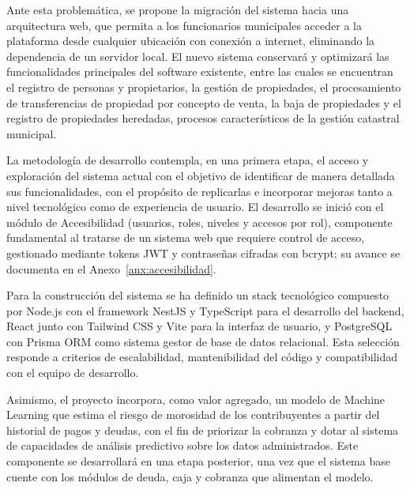 \documentclass[12pt,a4paper]{report}
\begin{document}
Ante esta problemática, se propone la migración del sistema hacia una arquitectura web, que permita a los funcionarios municipales acceder a la plataforma desde cualquier ubicación con conexión a internet, eliminando la dependencia de un servidor local. El nuevo sistema conservará y optimizará las funcionalidades principales del software existente, entre las cuales se encuentran el registro de personas y propietarios, la gestión de propiedades, el procesamiento de transferencias de propiedad por concepto de venta, la baja de propiedades y el registro de propiedades heredadas, procesos característicos de la gestión catastral municipal.

La metodología de desarrollo contempla, en una primera etapa, el acceso y exploración del sistema actual con el objetivo de identificar de manera detallada sus funcionalidades, con el propósito de replicarlas e incorporar mejoras tanto a nivel tecnológico como de experiencia de usuario. El desarrollo se inició con el módulo de Accesibilidad (usuarios, roles, niveles y accesos por rol), componente fundamental al tratarse de un sistema web que requiere control de acceso, gestionado mediante tokens JWT y contraseñas cifradas con bcrypt; su avance se documenta en el Anexo~\ref{anx:accesibilidad}.

Para la construcción del sistema se ha definido un stack tecnológico compuesto por Node.js con el framework NestJS y TypeScript para el desarrollo del backend, React junto con Tailwind CSS y Vite para la interfaz de usuario, y PostgreSQL con Prisma ORM como sistema gestor de base de datos relacional. Esta selección responde a criterios de escalabilidad, mantenibilidad del código y compatibilidad con el equipo de desarrollo.

Asimismo, el proyecto incorpora, como valor agregado, un modelo de Machine Learning que estima el riesgo de morosidad de los contribuyentes a partir del historial de pagos y deudas, con el fin de priorizar la cobranza y dotar al sistema de capacidades de análisis predictivo sobre los datos administrados. Este componente se desarrollará en una etapa posterior, una vez que el sistema base cuente con los módulos de deuda, caja y cobranza que alimentan el modelo.

\clearpage

\renewcommand{\contentsname}{Índices}
\renewcommand{\listfigurename}{Índice de Figuras}
\renewcommand{\listtablename}{Índice de Tablas}
\tableofcontents
\clearpage
\listoffigures
\clearpage
\listoftables
\clearpage
\end{document}
